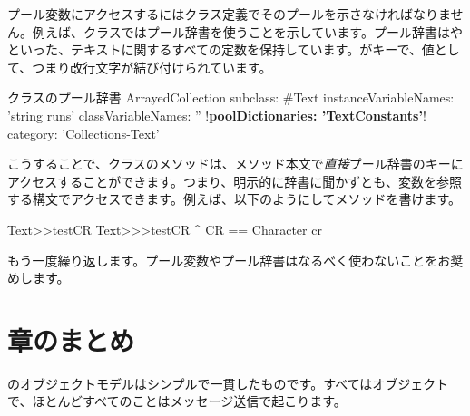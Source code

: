\documentclass[a4paper,10pt,twoside]{book}
\begin{document}
プール変数にアクセスするにはクラス定義でそのプールを示さなければなりません。例えば、クラスではプール辞書を使うことを示しています。プール辞書はやといった、テキストに関するすべての定数を保持しています。がキーで、値として、つまり改行文字が結び付けられています。

\begin{classdef}[textpooldict]{クラスのプール辞書}
ArrayedCollection subclass: #Text
        instanceVariableNames: 'string runs' 	
        classVariableNames: '' 	
        !\textbf{poolDictionaries: 'TextConstants'}!
        category: 'Collections-Text'
\end{classdef}
   
こうすることで、クラスのメソッドは、メソッド本文で\emph{直接}プール辞書のキーにアクセスすることができます。つまり、明示的に辞書に聞かずとも、変数を参照する構文でアクセスできます。例えば、以下のようにしてメソッドを書けます。
  
\begin{method}[texttestcr]{Text>>testCR}
Text>>>testCR 	
      ^ CR == Character cr
\end{method}

もう一度繰り返します。プール変数やプール辞書はなるべく使わないことをお奨めします。

\section{章のまとめ}

\pharo のオブジェクトモデルはシンプルで一貫したものです。すべてはオブジェクトで、ほとんどすべてのことはメッセージ送信で起こります。
\end{document}
